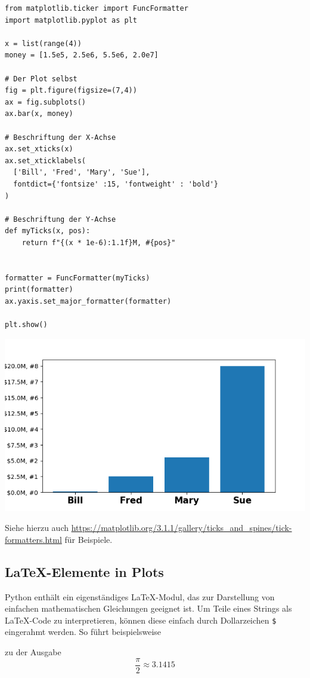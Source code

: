 \begin{codebox}
\begin{verbatim}
from matplotlib.ticker import FuncFormatter
import matplotlib.pyplot as plt

x = list(range(4))
money = [1.5e5, 2.5e6, 5.5e6, 2.0e7]

# Der Plot selbst
fig = plt.figure(figsize=(7,4))
ax = fig.subplots()
ax.bar(x, money)

# Beschriftung der X-Achse
ax.set_xticks(x)
ax.set_xticklabels(
  ['Bill', 'Fred', 'Mary', 'Sue'],
  fontdict={'fontsize' :15, 'fontweight' : 'bold'}
)

# Beschriftung der Y-Achse
def myTicks(x, pos):
    return f"{(x * 1e-6):1.1f}M, #{pos}"


formatter = FuncFormatter(myTicks)
print(formatter)
ax.yaxis.set_major_formatter(formatter)

plt.show()
\end{verbatim}
\end{codebox}
%
\begin{tcolorbox}[title=Ausgabe: FuncFormatter für Y-Ticks]
\begin{center}
	\includegraphics[width=.7\linewidth]{./gfx/plt-TicksFormatter}
\end{center}
\end{tcolorbox}

Siehe hierzu auch \url{https://matplotlib.org/3.1.1/gallery/ticks_and_spines/tick-formatters.html} für Beispiele.


\subsection{\LaTeX-Elemente in Plots}
Python enthält ein eigenständiges \LaTeX-Modul, das zur Darstellung von einfachen mathematischen Gleichungen geeignet ist. Um Teile eines Strings als \LaTeX-Code zu interpretieren, können diese einfach durch Dollarzeichen \texttt{\$} eingerahmt werden. So führt beispielsweise
\begin{center}
\end{center}
zu der Ausgabe
\[ \scriptstyle \frac{\pi}{2} \approx \text{3.1415} \]

